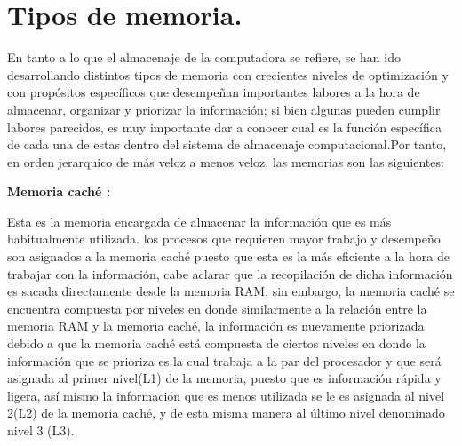 \documentclass[12pt]{article}
\begin{document}
\section{Tipos de memoria.} \label{contenido}
En tanto a lo que el almacenaje de la computadora se refiere, se han ido desarrollando distintos tipos de memoria con crecientes niveles de optimización y con propósitos específicos que desempeñan importantes labores a la hora de almacenar, organizar y priorizar la información; si bien algunas pueden cumplir labores parecidos, es muy importante dar a conocer cual es la función específica de cada una de estas dentro del sistema de almacenaje computacional.Por tanto, en orden jerarquico de más veloz a menos veloz, las memorias son las siguientes:
\begin{itemize}
\vspace{15PT}
\textbf{Memoria caché :}

Esta es la memoria encargada de almacenar la información que es más habitualmente utilizada. los procesos que requieren mayor trabajo y desempeño son asignados a la memoria caché puesto que esta es la más eficiente a la hora de trabajar con la información, cabe aclarar que la recopilación de dicha información es sacada directamente desde la memoria RAM, sin embargo, la memoria caché se encuentra compuesta por niveles en donde similarmente a la relación entre la memoria RAM y la memoria caché, la información es nuevamente priorizada debido a que la memoria caché está compuesta de ciertos niveles en donde la información que se prioriza es la cual  trabaja a la par del procesador y que será asignada al primer nivel(L1) de la memoria, puesto que es información rápida y ligera, así mismo la información que es menos utilizada se le es asignada al nivel 2(L2) de la memoria caché, y de esta misma manera al último nivel denominado nivel 3 (L3).


\end{itemize}
\end{document}
